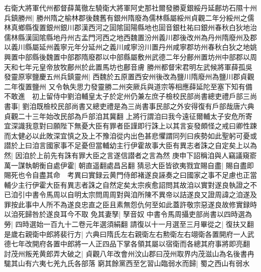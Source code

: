 右衛大將軍代州都督薛萬徹左驍衛大將軍阿史那社爾發勝夏銀綏丹延鄜坊石隰十州兵鎮勝州|{
	勝州隋之榆林郡後魏舊有銀州隋廢為儒林縣屬綏州貞觀二年分綏州之儒林真鄉縣復置銀州銀川郡漢西河之圁隂圁陽縣地也圁音銀杜祐曰銀州春秋白狄地治儒林縣漢圁隂縣地丹州古孟門河西之地西魏置汾州義川郡後改州為丹州隋廢州及郡以義川縣屬延州義寧元年分延州之義川咸寧汾川置丹州咸寧郡坊州春秋白狄之地姚興置中部縣後魏置中部郡隋廢郡以中部縣屬敷州武德二年分鄜州置坊州中部郡以周天和七年元皇帝放牧鄜州於此置馬坊也鄜音膚}
勝州都督宋君明左武候將軍薛孤吳發靈原寧鹽慶五州兵鎮靈州|{
	西魏於五原置西安州後改為鹽川隋廢州為鹽川郡貞觀二年復置鹽州}
又令執失思力發靈勝二州突厥兵與道宗等相應薛延陀至塞下知有備不敢進　初上留侍中劉洎輔皇太子於定州仍兼左庶子檢校民部尚書總吏禮戶部三尚書事|{
	劉洎既檢校民部尚書又總吏禮是為三尚書事民部之外安得復有戶部哉唐六典貞觀二十三年始改民部為戶部洎其冀翻}
上將行謂洎曰我今遠征爾輔太子安危所寄宜深識我意對曰願陛下無憂大臣有罪者臣謹即行誅上以其言妄發頗怪之戒曰卿性踈而太健必以此敗深宜慎之及上不豫洎從内出色甚悲懼謂同列曰疾勢如此聖躬可憂或譛於上曰洎言國家事不足憂但當輔幼主行伊霍故事大臣有異志者誅之自定矣上以為然|{
	因洎於上前先有誅有罪大臣之言遂信譛者之言為然}
庚申下詔稱洎與人竊議窺窬萬一謀執朝衡自處伊霍|{
	朝直遥翻處昌呂翻}
猜忌大臣皆欲夷戮宜賜自盡|{
	賜自盡即賜死也令自盡其命　考異曰實録云黄門侍郎褚遂良誣奏之曰國家之事不足慮也正當輔少主行伊霍大臣有異志者誅之自然定矣太宗疾愈詔問其故洎以實對遂良執證之不已洎引中書令馬周以自明太宗問周周對與洎所陳不異帝以詰遂良又證周諱之洎遂及罪按此事中人所不為遂良忠直之臣且素無怨仇何至如此蓋許敬宗惡遂良故修實録時以洎死歸咎於遂良耳今不取}
免其妻孥|{
	孥音奴}
中書令馬周攝吏部尚書以四時選為勞|{
	四時選始一百九十二卷元年選須絹翻}
請復以十一月選至三月畢從之|{
	復扶又翻}
是歲右親衛中郎將裴行方|{
	六典曰隋氏左右親衛左右勲衛左右翊衛各置開府一人武德七年改開府各置中郎將一人正四品下掌各領其屬以宿衛而各總其府事將即亮翻}
討茂州叛羌黄郎弄大破之|{
	貞觀八年改會州汶山郡曰茂州取界内茂滋山為名後書冉駹其山有六夷七羌九氏各部落}
窮其餘黨西至乞習山臨弱水而歸|{
	蜀之西山有弱水}


